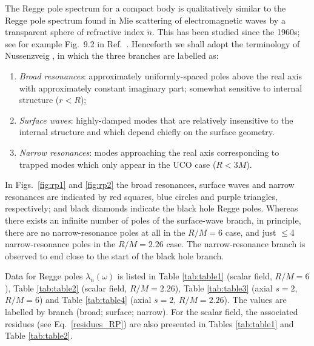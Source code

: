 \documentclass[aps,prd,longbibliography,reprint,twocolumn,amsmath,amssymb,amsfonts,showpacs,footnote,superscriptaddress]{revtex4-1}%
\begin{document}
The Regge pole spectrum for a compact body is qualitatively similar to the Regge pole spectrum found in Mie scattering of electromagnetic waves by a transparent sphere of refractive index $\tilde{n}$. This has been studied since the 1960s; see for example Fig.~9.2 in Ref.~\cite{Nussenzveig:2006}. %
Henceforth we shall adopt the terminology of Nussenzveig \cite{Nussenzveig:2006}, in which the three branches are labelled as:
\begin{enumerate}
 \item \emph{Broad resonances}: approximately uniformly-spaced poles above the real axis with approximately constant imaginary part; somewhat sensitive to internal structure ($r < R$);
 \item \emph{Surface waves}: highly-damped modes that are relatively insensitive to the internal structure and which depend chiefly on the surface geometry.
 \item \emph{Narrow resonances}: modes approaching the real axis corresponding to trapped modes which only appear in the UCO case ($R < 3M$).
\end{enumerate}
In Figs.~\ref{fig:rp1} and \ref{fig:rp2} the broad resonances, surface waves and narrow resonances are indicated by red squares, blue circles and purple triangles, respectively; and black diamonds indicate the black hole Regge poles. Whereas there exists an infinite number of poles of the surface-wave branch, in principle, there are no narrow-resonance poles at all in the $R/M = 6$ case, and just $\le 4$ narrow-resonance poles in the $R/M = 2.26$ case. The narrow-resonance branch is observed to end close to the start of the black hole branch.

Data for Regge poles $\lambda_n(\omega)$ is listed in Table \ref{tab:table1} (scalar field, $R/M=6$), Table \ref{tab:table2} (scalar field, $R/M = 2.26$), Table \ref{tab:table3} (axial $s=2$, $R/M = 6$) and Table \ref{tab:table4} (axial $s=2$, $R/M = 2.26$). The values are labelled by branch (broad; surface; narrow). For the scalar field, the associated residues (see Eq.~\eqref{residues_RP}) are also presented in Tables \ref{tab:table1} and Table \ref{tab:table2}.
\end{document}
